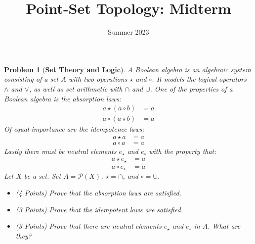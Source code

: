 \documentclass{article}
\title{Point-Set Topology: Midterm}
\date{Summer 2023}
\theoremstyle{normal}
\newtheorem{problem}{Problem}
\begin{document}
    \maketitle
    \color{blue}
    \begin{problem}[\textbf{Set Theory and Logic}]
        \par\hfill\par
        A Boolean algebra is an algebraic system consisting of a set $A$
        with two operations $\star$ and $\circ$. It models the logical
        operators $\land$ and $\lor$, as well as set arithmetic with
        $\cap$ and $\cup$. One of the properties of a Boolean algebra is the
        \textit{absorption laws}:
        \begin{align}
            a\star(a\circ{b})&=a\\
            a\circ(a\star{b})&=a
        \end{align}
        Of equal importance are the \textit{idempotence laws}:
        \begin{align}
            a\star{a}&=a\\
            a\circ{a}&=a
        \end{align}
        Lastly there must be neutral elements
        $e_{\star}$ and $e_{\circ}$ with the property that:
        \begin{align}
            a\star{e}_{\star}&=a\\
            a\circ{e}_{\circ}&=a
        \end{align}
        Let $X$ be a set. Set $A=\mathcal{P}(X)$, $\star=\cap$, and
        $\circ=\cup$.
        \begin{itemize}
            \item (4 Points) Prove that the absorption laws are satisfied.
            \item (3 Points) Prove that the idempotent laws are satisfied.
            \item (3 Points) Prove that there are neutral elements
                $e_{\star}$ and $e_{\circ}$ in $A$. What are they?
        \end{itemize}
    \end{problem}
    \color{black}
\end{document}
